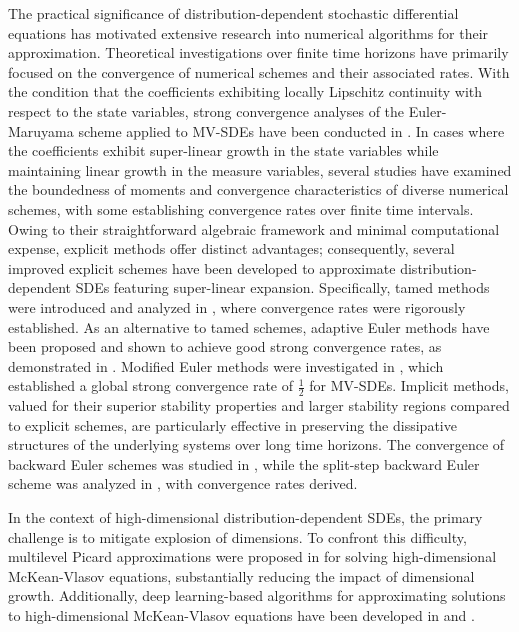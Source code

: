 \documentclass[12pt]{article}
\numberwithin{equation}{section}
\begin{document}
The practical significance of distribution-dependent stochastic differential equations has motivated extensive research into numerical algorithms for their approximation. Theoretical investigations over finite time horizons have primarily focused on the convergence of numerical schemes and their associated rates. With the condition that the coefficients exhibiting locally Lipschitz continuity with respect to the state variables,  strong convergence analyses of the Euler-Maruyama scheme applied to MV-SDEs have been conducted in \cite{li2023strong}. In cases where the coefficients exhibit super-linear growth in the state variables while maintaining linear growth in the measure variables, several studies have examined the boundedness of moments and convergence characteristics of diverse numerical schemes, with some establishing convergence rates over finite time intervals. Owing to their straightforward algebraic framework and minimal computational expense, explicit methods offer distinct advantages; consequently, several improved explicit schemes have been developed to approximate distribution-dependent SDEs featuring super-linear expansion. Specifically, tamed methods were introduced and analyzed in \cite{dos2022simulation, liu2023tamed, bao2021first, kumar2021explicit, Kumar2022Well-posedness}, where convergence rates were rigorously established. As an alternative to tamed schemes, adaptive Euler methods have been proposed and shown to achieve good  strong convergence rates, as demonstrated in \cite{reisinger2022adaptive}. Modified Euler methods were investigated in \cite{jian2025modified}, which established a global strong convergence rate of $\tfrac{1}{2}$ for MV-SDEs. Implicit methods, valued for their superior stability properties and larger stability regions compared to explicit schemes, are particularly effective in preserving the dissipative structures of the underlying systems over long time horizons. The convergence of backward Euler schemes was studied in \cite{dos2022simulation}, while the split-step backward Euler scheme was analyzed in \cite{chen2022flexible, chen2024euler}, with convergence rates derived.

In the context of high-dimensional distribution-dependent SDEs, the primary challenge is to mitigate explosion of dimensions. To confront this difficulty, multilevel Picard approximations were proposed in \cite{hutzenthaler2022multilevel} for solving high-dimensional McKean-Vlasov equations, substantially reducing the impact of dimensional growth. Additionally, deep learning-based algorithms for approximating solutions to high-dimensional McKean-Vlasov equations have been developed in \cite{han2024learning} and \cite{germain2022numerical}.
\end{document}
